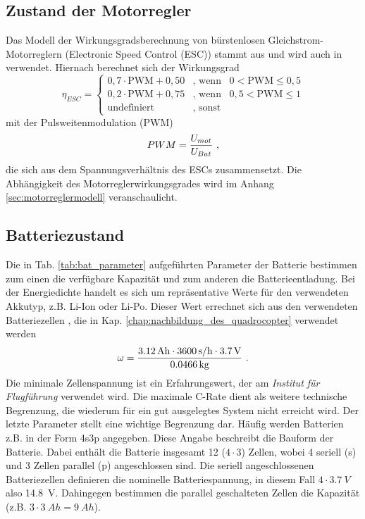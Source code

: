 \subsection{Zustand der Motorregler}
\label{subsec:motorreglerzustand}
Das Modell der Wirkungsgradsberechnung von bürstenlosen Gleichstrom-Motorreglern (Electronic Speed Control (ESC)) stammt aus \cite{Lubrano.2016} und wird auch in \cite{Beyer.2016} verwendet. Hiernach berechnet sich der Wirkungsgrad 
\begin{equation}
\eta_{ESC} = \begin{cases} 
0,7\cdot \text{PWM} + 0,50 & \text{, wenn} \;\;\; 0 < \text{PWM} \leq 0,5 \\ 
0,2\cdot \text{PWM} + 0,75 & \text{, wenn} \;\;\; 0,5 < \text{PWM} \leq 1 \\ 
\text{undefiniert} & \text{, sonst} 
\end{cases}
\label{eq:eta_pwm}
\end{equation} 
mit der Pulsweitenmodulation (PWM) 
\begin{equation}
	PWM = \frac{U_{mot}}{U_{Bat}} ~\text{,}
	\label{eq:pwm}
\end{equation}
die sich aus dem Spannungsverhältnis des ESCs zusammensetzt. Die Abhängigkeit des Motorreglerwirkungsgrades wird im Anhang \ref{sec:motorreglermodell} veranschaulicht.


\subsection{Batteriezustand}
\label{subsec:batteriezustand}

Die in Tab. \ref{tab:bat_parameter} aufgeführten Parameter der Batterie bestimmen zum einen die verfügbare Kapazität und zum anderen die Batterieentladung. Bei der Energiedichte handelt es sich um repräsentative Werte für den verwendeten Akkutyp, z.B. Li-Ion oder Li-Po. Dieser Wert errechnet sich aus den verwendeten Batteriezellen \cite{batteriezelle}, die in Kap. \ref{chap:nachbildung_des_quadrocopter} verwendet werden
\begin{equation}
	\omega = \frac{\SI{3.12}{Ah}\cdot \SI{3600}{s/h}\cdot \SI{3,7}{V}}{\SI{0.0466}{kg}} ~\text{.}
\end{equation}
Die minimale Zellenspannung ist ein Erfahrungswert, der am \textit{Institut für Flugführung} verwendet wird. Die maximale C-Rate dient als weitere technische Begrenzung, die wiederum für ein gut ausgelegtes System nicht erreicht wird. Der letzte Parameter stellt eine wichtige Begrenzung dar.
Häufig werden Batterien z.B. in der Form 4s3p angegeben. Diese Angabe beschreibt die Bauform der Batterie. Dabei enthält die Batterie insgesamt 12 (\ensuremath{4\cdot 3}) Zellen, wobei 4 seriell (s) und 3 Zellen parallel (p) angeschlossen sind. Die seriell angeschlossenen Batteriezellen definieren die nominelle Batteriespannung, in diesem Fall \ensuremath{4\cdot \SI{3,7}{V}} also \SI{14,8}{V}. Dahingegen bestimmen die parallel geschalteten Zellen die Kapazität (z.B. \ensuremath{3\cdot \SI{3}{Ah} = \SI{9}{Ah}}).

